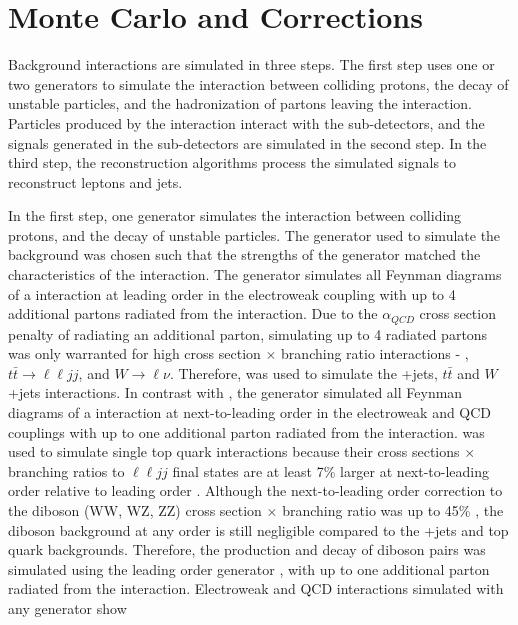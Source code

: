\clearpage

\section{Monte Carlo and Corrections}
\label{sec:MC}
Background interactions are simulated in three steps.  The first step uses one or two \MC generators to simulate the interaction between 
colliding protons, the decay of unstable particles, and the hadronization of partons leaving the interaction.  Particles produced by the 
interaction interact with the sub-detectors, and the signals generated in the sub-detectors are simulated in the second step.  In the third 
step, the reconstruction algorithms process the simulated signals to reconstruct leptons and jets.

In the first step, one \MC generator simulates the interaction between colliding protons, and the decay of unstable particles.  
The \MC generator used to simulate the background was chosen such that the strengths of the generator matched the characteristics of the 
interaction.  The \MADGRAPH generator \cite{madgraph} simulates all Feynman diagrams of a interaction at leading order in the electroweak 
coupling with up to 4 additional partons radiated from the interaction.  Due to the $\alpha_{QCD}$ cross section penalty of radiating an 
additional parton, simulating up to 4 radiated partons was only warranted for high cross section $\times$ branching ratio interactions - \DY, 
$t\bar{t} \rightarrow \ell\ell jj$, and $W \rightarrow \ell\nu$.  Therefore, \MADGRAPH was used to simulate the \DY+jets, $t\bar{t}$ 
and $W$+jets interactions.  In contrast with \MADGRAPH, the \POWHEG generator \cite{powheg} simulated all Feynman diagrams of a 
interaction at next-to-leading order in the electroweak and QCD couplings with up to one additional parton radiated from the interaction.  
\POWHEG was used to simulate single top quark interactions because their cross sections $\times$ branching ratios to $\ell\ell jj$ 
final states are at least 7\% larger at next-to-leading order relative to leading order \cite{singleTopNLOvsLO}.  
Although the next-to-leading order correction to the diboson (WW, WZ, ZZ) cross section $\times$ branching ratio was up to 45\% 
\cite{dibosonLOvsNLO}, the diboson background at any order is still negligible compared to the \DY+jets and top quark backgrounds.  Therefore, 
the production and decay of diboson pairs was simulated using the leading order \PYTHIA generator \cite{pythia8,Sjostrand:2006za}, 
with up to one additional parton radiated from the interaction.  Electroweak and QCD interactions simulated with any \MC generator show 
